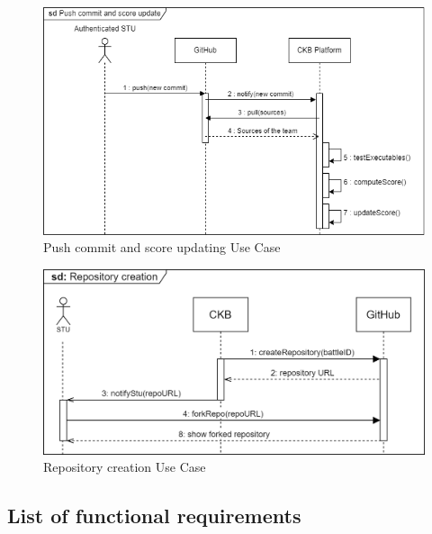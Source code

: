 \begin{figure}[H]
    \centering
    \includegraphics[width=1\textwidth]{images/sequence_diagrams/ClassDiagram-UC18-SequenceDiagram.png}
    \caption{Push commit and score updating Use Case}
    \label{fig:uc17}
\end{figure}
\begin{figure}[H]
    \centering
    \includegraphics[width=1\textwidth]{images/sequence_diagrams/.png/Repository_Creation - UC18.png}
    \caption{Repository creation Use Case}
    \label{fig:uc18}
\end{figure}

\subsection{List of functional requirements}


